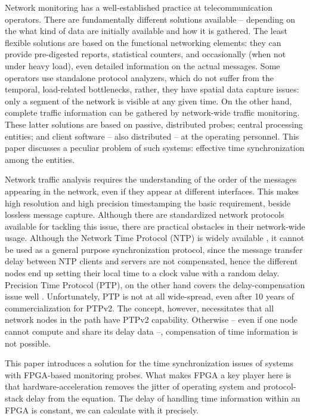 \documentclass[journal]{IEEEtran}
\begin{document}
Network monitoring has a well-established practice at telecommunication operators. There are fundamentally different solutions available -- depending on the what kind of data are initially available and how it is gathered. The least flexible solutions are based on the functional networking elements: they can provide pre-digested reports, statistical counters, and occasionally (when not under heavy load), even detailed information on the actual messages. Some operators use standalone protocol analyzers, which do not suffer from the temporal, load-related bottlenecks, rather, they have spatial data capture issues: only a segment of the network is visible at any given time. On the other hand, complete traffic information can be gathered by network-wide traffic monitoring. These latter solutions are based on passive, distributed probes; central processing entities; and client software -- also distributed -- at the operating personnel. This paper discusses a peculiar problem of such systems: effective time synchronization among the entities.

Network traffic analysis requires the understanding of the order of the messages appearing in the network, even if they appear at different interfaces. This makes high resolution and high precision timestamping the basic requirement, beside lossless message capture. 
Although there are standardized network protocols available for tackling this issue, there are practical obstacles in their network-wide usage. Although the Network Time Protocol (NTP) is widely available \cite{NTP_standard}, it cannot be used as a general purpose synchronization protocol, since the message transfer delay between NTP clients and servers are not compensated, hence the different nodes end up setting their local time to a clock value with a random delay. Precision Time Protocol (PTP), on the other hand covers the delay-compensation issue well \cite{PTP_standard}. Unfortunately, PTP is not at all wide-spread, even after 10 years of commercialization for PTPv2. The concept, however, necessitates that all network nodes in the path have PTPv2 capability. Otherwise -- even if one node cannot compute and share its delay data --, compensation of time information is not possible.

This paper introduces a solution for the time synchronization issues of systems with FPGA-based monitoring probes. What makes FPGA a key player here is that hardware-acceleration removes the jitter of operating system and protocol-stack delay from the equation. The delay of handling time information within an FPGA is constant, we can calculate with it precisely.
\end{document}
